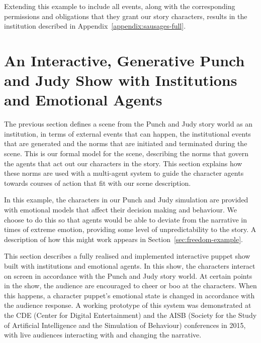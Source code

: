 \documentclass[11pt]{report}
\begin{document}
Extending this example to include all events, along with the corresponding
permissions and obligations that they grant our story characters, results in the
institution described in Appendix~\ref{appendix:sausages-full}.

\section{An Interactive, Generative Punch and Judy Show with Institutions and
  Emotional Agents}
\label{sec:punchjudy}
The previous section defines a scene from the Punch and Judy story world as an
institution, in terms of external events that can happen, the institutional
events that are generated and the norms that are initiated and terminated during
the scene. This is our formal model for the scene, describing the norms that
govern the agents that act out our characters in the story. This section explains
how these norms are used with a multi-agent system to guide the character agents
towards courses of action that fit with our scene description.

In this example, the characters in our Punch and Judy simulation
are provided with emotional models that affect their decision making and behaviour. We choose
to do this so that agents would be able to deviate from the narrative in times
of extreme emotion, providing some level of unpredictability to the story. A
description of how this might work appears in Section~\ref{sec:freedom-example}.

This section describes a fully realised and implemented interactive puppet show
built with institutions and emotional agents. In this show, the characters
interact on screen in accordance with the Punch and Judy story world. At certain
points in the show, the audience are encouraged to cheer or boo at the
characters. When this happens, a character puppet's emotional state is changed
in accordance with the audience response. A working prototype of this system was demonstrated at the CDE
(Center for Digital Entertainment) and the AISB (Society for the Study of
Artificial Intelligence and the Simulation of Behaviour) conferences in 2015,
with live audiences interacting with and changing the narrative.
\end{document}
